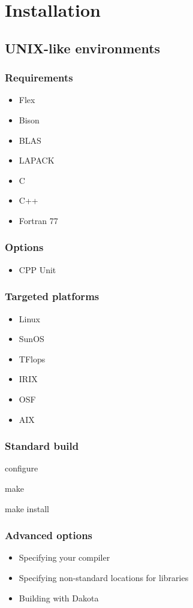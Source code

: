 \documentclass{article}
\begin{document}
\section{Installation}\label{sec:installation}
\subsection{UNIX-like environments}
\subsubsection{Requirements}
\begin{itemize}
\item Flex
\item Bison
\item BLAS
\item LAPACK
\item C
\item C++ 
\item Fortran 77
\end{itemize}
\subsubsection{Options}
\begin{itemize}
\item CPP Unit
\end{itemize}
\subsubsection{Targeted platforms}
\begin{itemize}
\item Linux
\item SunOS
\item TFlops 
\item IRIX
\item OSF
\item AIX 
\end{itemize}
\subsubsection{Standard build}
configure

make

make install

\subsubsection{Advanced options}
\begin{itemize}
\item Specifying your compiler 
\item Specifying non-standard locations for libraries
\item Building with Dakota 
\end{itemize}
\end{document}
